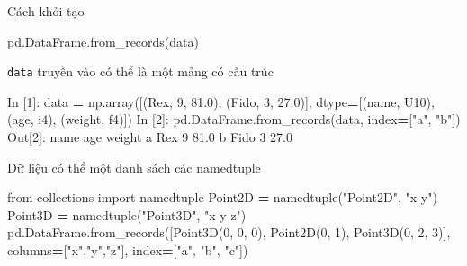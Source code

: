 \documentclass[
]{book}
\newenvironment{Shaded}{\begin{snugshade}}{\end{snugshade}}
\newcommand{\DecValTok}[1]{\textcolor[rgb]{0.00,0.00,0.81}{#1}}
\newcommand{\FloatTok}[1]{\textcolor[rgb]{0.00,0.00,0.81}{#1}}
\newcommand{\ImportTok}[1]{#1}
\newcommand{\NormalTok}[1]{#1}
\newcommand{\OperatorTok}[1]{\textcolor[rgb]{0.81,0.36,0.00}{\textbf{#1}}}
\newcommand{\StringTok}[1]{\textcolor[rgb]{0.31,0.60,0.02}{#1}}
\begin{document}
Cách khởi tạo

\begin{Shaded}
\begin{Highlighting}[]
\NormalTok{pd.DataFrame.from\_records(data)}
\end{Highlighting}
\end{Shaded}

\texttt{data} truyền vào có thể là một mảng có cấu trúc

\begin{Shaded}
\begin{Highlighting}[]
\NormalTok{In [}\DecValTok{1}\NormalTok{]: data }\OperatorTok{=}\NormalTok{ np.array([(}\StringTok{\textquotesingle{}Rex\textquotesingle{}}\NormalTok{, }\DecValTok{9}\NormalTok{, }\FloatTok{81.0}\NormalTok{), (}\StringTok{\textquotesingle{}Fido\textquotesingle{}}\NormalTok{, }\DecValTok{3}\NormalTok{, }\FloatTok{27.0}\NormalTok{)],}
\NormalTok{                        dtype}\OperatorTok{=}\NormalTok{[(}\StringTok{\textquotesingle{}name\textquotesingle{}}\NormalTok{, }\StringTok{\textquotesingle{}U10\textquotesingle{}}\NormalTok{), (}\StringTok{\textquotesingle{}age\textquotesingle{}}\NormalTok{, }\StringTok{\textquotesingle{}i4\textquotesingle{}}\NormalTok{), (}\StringTok{\textquotesingle{}weight\textquotesingle{}}\NormalTok{, }\StringTok{\textquotesingle{}f4\textquotesingle{}}\NormalTok{)])}
\NormalTok{In [}\DecValTok{2}\NormalTok{]: pd.DataFrame.from\_records(data, index}\OperatorTok{=}\NormalTok{[}\StringTok{"a"}\NormalTok{, }\StringTok{"b"}\NormalTok{])}
\NormalTok{Out[}\DecValTok{2}\NormalTok{]: }
\NormalTok{   name  age  weight}
\NormalTok{a   Rex    }\DecValTok{9}    \FloatTok{81.0}
\NormalTok{b  Fido    }\DecValTok{3}    \FloatTok{27.0}
\end{Highlighting}
\end{Shaded}

Dữ liệu có thể một danh sách các namedtuple

\begin{Shaded}
\begin{Highlighting}[]
\ImportTok{from}\NormalTok{ collections }\ImportTok{import}\NormalTok{ namedtuple}
\NormalTok{Point2D }\OperatorTok{=}\NormalTok{ namedtuple(}\StringTok{"Point2D"}\NormalTok{, }\StringTok{"x y"}\NormalTok{)}
\NormalTok{Point3D }\OperatorTok{=}\NormalTok{ namedtuple(}\StringTok{"Point3D"}\NormalTok{, }\StringTok{"x y z"}\NormalTok{)}
\NormalTok{pd.DataFrame.from\_records([Point3D(}\DecValTok{0}\NormalTok{, }\DecValTok{0}\NormalTok{, }\DecValTok{0}\NormalTok{), Point2D(}\DecValTok{0}\NormalTok{, }\DecValTok{1}\NormalTok{), Point3D(}\DecValTok{0}\NormalTok{, }\DecValTok{2}\NormalTok{, }\DecValTok{3}\NormalTok{)],}
\NormalTok{                          columns}\OperatorTok{=}\NormalTok{[}\StringTok{"x"}\NormalTok{,}\StringTok{"y"}\NormalTok{,}\StringTok{"z"}\NormalTok{], index}\OperatorTok{=}\NormalTok{[}\StringTok{"a"}\NormalTok{, }\StringTok{"b"}\NormalTok{, }\StringTok{"c"}\NormalTok{])}
\end{Highlighting}
\end{Shaded}
\end{document}
